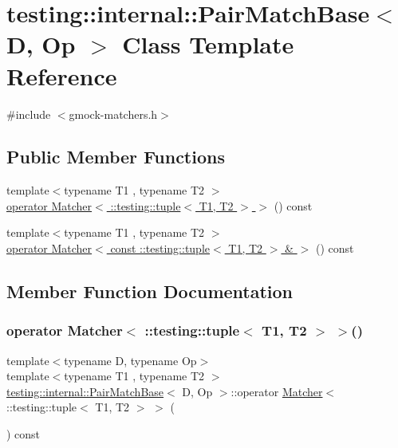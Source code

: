 \hypertarget{classtesting_1_1internal_1_1_pair_match_base}{}\section{testing\+:\+:internal\+:\+:Pair\+Match\+Base$<$ D, Op $>$ Class Template Reference}
\label{classtesting_1_1internal_1_1_pair_match_base}


{\ttfamily \#include $<$gmock-\/matchers.\+h$>$}

\subsection*{Public Member Functions}
\begin{DoxyCompactItemize}
\item 
{\footnotesize template$<$typename T1 , typename T2 $>$ }\\\hyperlink{classtesting_1_1internal_1_1_pair_match_base_ae73a3764537d725ce10e9e806ebdb417}{operator Matcher$<$ \+::testing\+::tuple$<$ T1, T2 $>$ $>$} () const
\item 
{\footnotesize template$<$typename T1 , typename T2 $>$ }\\\hyperlink{classtesting_1_1internal_1_1_pair_match_base_a0482f7e530420faecf00b9fca059b694}{operator Matcher$<$ const \+::testing\+::tuple$<$ T1, T2 $>$ \& $>$} () const
\end{DoxyCompactItemize}


\subsection{Member Function Documentation}
\mbox{\label{classtesting_1_1internal_1_1_pair_match_base_ae73a3764537d725ce10e9e806ebdb417}} 
\subsubsection{\texorpdfstring{operator Matcher$<$ \+::testing\+::tuple$<$ T1, T2 $>$ $>$()}{operator Matcher< ::testing::tuple< T1, T2 > >()}}
{\footnotesize\ttfamily template$<$typename D, typename Op$>$ \\
template$<$typename T1 , typename T2 $>$ \\
\hyperlink{classtesting_1_1internal_1_1_pair_match_base}{testing\+::internal\+::\+Pair\+Match\+Base}$<$ D, Op $>$\+::operator \hyperlink{classtesting_1_1_matcher}{Matcher}$<$ \+::testing\+::tuple$<$ T1, T2 $>$ $>$ (\begin{DoxyParamCaption}{ }\end{DoxyParamCaption}) const\hspace{0.3cm}{\ttfamily [inline]}}


